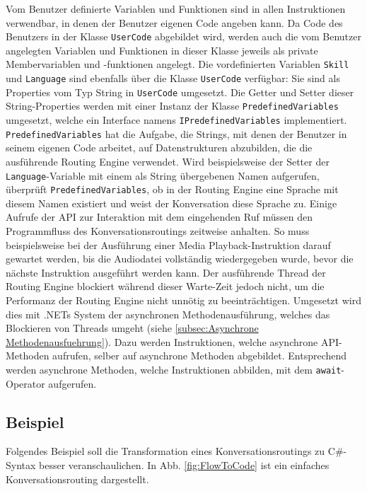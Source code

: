 Vom Benutzer definierte Variablen und Funktionen sind in allen Instruktionen verwendbar, in denen der Benutzer eigenen Code angeben kann. Da Code des Benutzers in der Klasse \texttt{UserCode} abgebildet wird, werden auch die vom Benutzer angelegten Variablen und Funktionen in dieser Klasse jeweils als private Membervariablen und -funktionen angelegt. Die vordefinierten Variablen \texttt{Skill} und \texttt{Language} sind ebenfalls über die Klasse \texttt{UserCode} verfügbar: Sie sind als Properties vom Typ String in \texttt{UserCode} umgesetzt. Die Getter und Setter dieser String-Properties werden mit einer Instanz der Klasse \texttt{PredefinedVariables} umgesetzt, welche ein Interface namens \texttt{IPredefinedVariables} implementiert. \texttt{PredefinedVariables} hat die Aufgabe, die Strings, mit denen der Benutzer in seinem eigenen Code arbeitet, auf Datenstrukturen abzubilden, die die ausführende Routing Engine verwendet. Wird beispielsweise der Setter der \texttt{Language}-Variable mit einem als String übergebenen Namen aufgerufen, überprüft \texttt{PredefinedVariables}, ob in der Routing Engine eine Sprache mit diesem Namen existiert und weist der Konversation diese Sprache zu. 
\newline
Einige Aufrufe der API zur Interaktion mit dem eingehenden Ruf müssen den Programmfluss des Konversationsroutings zeitweise anhalten. So muss beispielsweise bei der Ausführung einer Media Playback-Instruktion darauf gewartet werden, bis die Audiodatei vollständig wiedergegeben wurde, bevor die nächste Instruktion ausgeführt werden kann. Der ausführende Thread der Routing Engine blockiert während dieser Warte-Zeit jedoch nicht, um die Performanz der Routing Engine nicht unnötig zu beeinträchtigen. Umgesetzt wird dies mit .NETs System der asynchronen Methodenausführung, welches das Blockieren von Threads umgeht (siehe \ref{subsec:Asynchrone Methodenausfuehrung}). Dazu werden Instruktionen, welche asynchrone API-Methoden aufrufen, selber auf asynchrone Methoden abgebildet. Entsprechend werden asynchrone Methoden, welche Instruktionen abbilden, mit dem \texttt{await}-Operator aufgerufen.

\subsection{Beispiel}
\label{subsec:Beispiel}
Folgendes Beispiel soll die Transformation eines Konversationsroutings zu C\#-Syntax besser veranschaulichen. In Abb. \ref{fig:FlowToCode} ist ein einfaches Konversationsrouting dargestellt. 
\newpage

